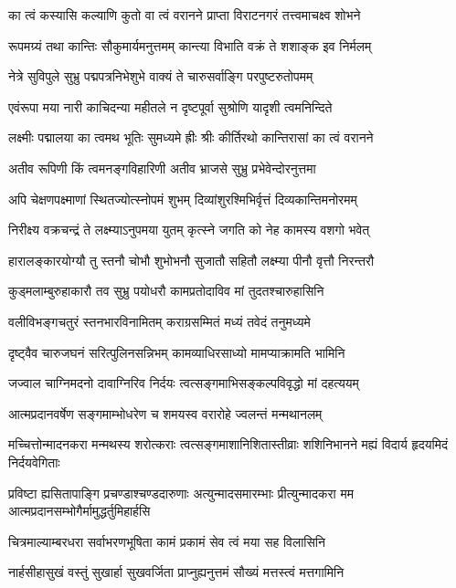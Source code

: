 \twolineshloka
{का त्वं कस्यासि कल्याणि कुतो वा त्वं वरानने}
{प्राप्ता विराटनगरं तत्त्वमाचक्ष्व शोभने}


\twolineshloka
{रूपमग्र्यं तथा कान्तिः सौकुमार्यमनुत्तमम्}
{कान्त्या विभाति वक्रं ते शशाङ्क इव निर्मलम्}


\twolineshloka
{नेत्रे सुविपुले सुभ्रु पद्मपत्रनिभेशुभे}
{वाक्यं ते चारुसर्वाङ्गि परपुष्टरुतोपमम्}


\twolineshloka
{एवंरूपा मया नारी काचिदन्या महीतले}
{न दृष्टपूर्वा सुश्रोणि यादृशी त्वमनिन्दिते}


\twolineshloka
{लक्ष्मीः पद्मालया का त्वमथ भूतिः सुमध्यमे}
{ह्रीः श्रीः कीर्तिरथो कान्तिरासां का त्वं वरानने}


\twolineshloka
{अतीव रूपिणी किं त्वमनङ्गविहारिणी}
{अतीव भ्राजसे सुभ्रु प्रभेवेन्दोरनुत्तमा}


\twolineshloka
{अपि चेक्षणपक्ष्माणां स्थितज्योत्स्नोपमं शुभम्}
{दिव्यांशुरश्मिभिर्वृत्तं दिव्यकान्तिमनोरमम्}


\twolineshloka
{निरीक्ष्य वक्रचन्द्रं ते लक्ष्म्याऽनुपमया युतम्}
{कृत्स्ने जगति को नेह कामस्य वशगो भवेत्}


\twolineshloka
{हारालङ्कारयोग्यौ तु स्तनौ चोभौ शुभोभनौ}
{सुजातौ सहितौ लक्ष्म्या पीनौ वृत्तौ निरन्तरौ}


\twolineshloka
{कुड्मलाम्बुरुहाकारौ तव सुभ्रु पयोधरौ}
{कामप्रतोदाविव मां तुदतश्चारुहासिनि}


\twolineshloka
{वलीविभङ्गचतुरं स्तनभारविनामितम्}
{कराग्रसम्मितं मध्यं तवेदं तनुमध्यमे}


\twolineshloka
{दृष्ट्वैव चारुजघनं सरित्पुलिनसन्निभम्}
{कामव्याधिरसाध्यो मामप्याक्रामति भामिनि}


\twolineshloka
{जज्वाल चाग्निमदनो दावाग्निरिव निर्दयः}
{त्वत्सङ्गमाभिसङ्कल्पविवृद्धो मां दहत्ययम्}


\twolineshloka
{आत्मप्रदानवर्षेण सङ्गमाम्भोधरेण च}
{शमयस्व वरारोहे ज्वलन्तं मन्मथानलम्}


\threelineshloka
{मच्चित्तोन्मादनकरा मन्मथस्य शरोत्कराः}
{त्वत्सङ्गमाशानिशितास्तीव्राः शशिनिभानने}
{मह्यं विदार्य हृदयमिदं निर्दयवेगिताः}


\threelineshloka
{प्रविष्टा ह्यसितापाङ्गि प्रचण्डाश्चण्डदारुणाः}
{अत्युन्मादसमारम्भाः प्रीत्युन्मादकरा मम}
{आत्मप्रदानसम्भोगैर्मामुद्धर्तुमिहार्हसि}


\twolineshloka
{चित्रमाल्याम्बरधरा सर्वाभरणभूषिता}
{कामं प्रकामं सेव त्वं मया सह विलासिनि}


\twolineshloka
{नार्हसीहासुखं वस्तुं सुखार्हा सुखवर्जिता}
{प्राप्नुह्यनुत्तमं सौख्यं मत्तस्त्वं मत्तगामिनि}


